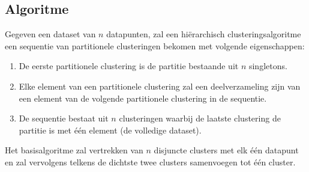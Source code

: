 \documentclass[a4paper,12pt]{article}
\theoremstyle{definition}
\begin{document}
 
\subsection{Algoritme}
Gegeven een dataset van $n$ datapunten, zal een hiërarchisch clusteringsalgoritme
een sequentie van partitionele clusteringen bekomen met volgende eigenschappen:
\begin{enumerate}
 \item De eerste partitionele clustering is de partitie bestaande uit $n$ singletons.
 \item Elke element van een partitionele clustering zal een deelverzameling zijn van
 een element van de volgende partitionele clustering in de sequentie.
 \item De sequentie bestaat uit $n$ clusteringen waarbij de laatste clustering
 de partitie is met één element (de volledige dataset).
\end{enumerate}

Het basisalgoritme zal vertrekken van $n$ disjuncte clusters met elk één datapunt
en zal vervolgens telkens de dichtste twee clusters samenvoegen tot één cluster.
\end{document}
